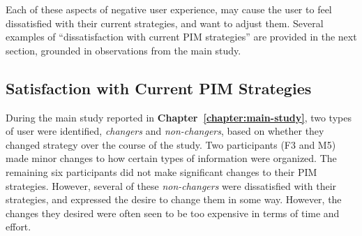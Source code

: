 Each of these aspects of negative user experience, may cause the user to feel dissatisfied with their current strategies, and want to adjust them.   Several examples of ``dissatisfaction with current PIM strategies'' are provided in the next section, grounded in observations from the main study.







\subsection{Satisfaction with Current PIM Strategies}
\label{discussion:uxp-settled}

During the main study reported in \textbf{Chapter~\ref{chapter:main-study}},  two types of user were identified, \textit{changers} and \textit{non-changers}, based on whether they changed strategy over the course of the study.  %
Two participants (F3 and M5) made minor changes to how certain types of information were organized.  The remaining six participants did not make significant changes to their PIM strategies. However, several of these \textit{non-changers} were dissatisfied with their strategies, and expressed the desire to change them in some way.  However, the changes they desired were often seen to be too expensive in terms of time and effort.  

